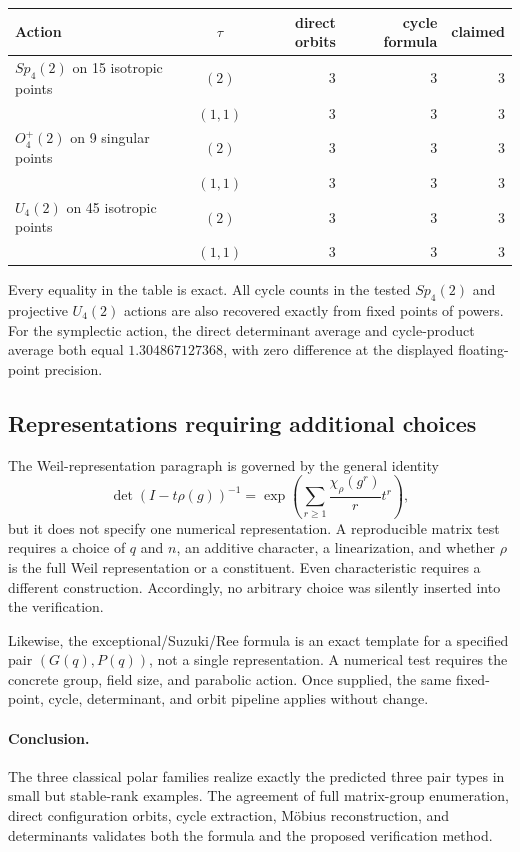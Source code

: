 \documentclass[10pt]{article}
\begin{document}
\begin{center}
\begin{tabular}{@{}lcrrr@{}}
\toprule
Action & $\tau$ & direct orbits & cycle formula & claimed\\
\midrule
$Sp_4(2)$ on 15 isotropic points & $(2)$ &3&3&3\\
 & $(1,1)$ &3&3&3\\
$O_4^+(2)$ on 9 singular points & $(2)$ &3&3&3\\
 & $(1,1)$ &3&3&3\\
$U_4(2)$ on 45 isotropic points & $(2)$ &3&3&3\\
 & $(1,1)$ &3&3&3\\
\bottomrule
\end{tabular}
\end{center}

Every equality in the table is exact.  All cycle counts in the tested
$Sp_4(2)$ and projective $U_4(2)$ actions are also recovered exactly from
fixed points of powers.  For the symplectic action, the direct determinant
average and cycle-product average both equal $1.304867127368$, with zero
difference at the displayed floating-point precision.

\subsection{Representations requiring additional choices}
The Weil-representation paragraph is governed by the general identity
\[
 \det(I-t\rho(g))^{-1}=\exp\left(
 \sum_{r\geq1}\frac{\chi_\rho(g^r)}{r}t^r\right),
\]
but it does not specify one numerical representation.  A reproducible matrix
test requires a choice of $q$ and $n$, an additive character, a linearization,
and whether $\rho$ is the full Weil representation or a constituent.  Even
characteristic requires a different construction.  Accordingly, no arbitrary
choice was silently inserted into the verification.

Likewise, the exceptional/Suzuki/Ree formula is an exact template for a
specified pair $(G(q),P(q))$, not a single representation.  A numerical test
requires the concrete group, field size, and parabolic action.  Once supplied,
the same fixed-point, cycle, determinant, and orbit pipeline applies without
change.

\paragraph{Conclusion.}
The three classical polar families realize exactly the predicted three pair
types in small but stable-rank examples.  The agreement of full matrix-group
enumeration, direct configuration orbits, cycle extraction, M\"obius
reconstruction, and determinants validates both the formula and the proposed
verification method.
\endgroup
\end{document}
